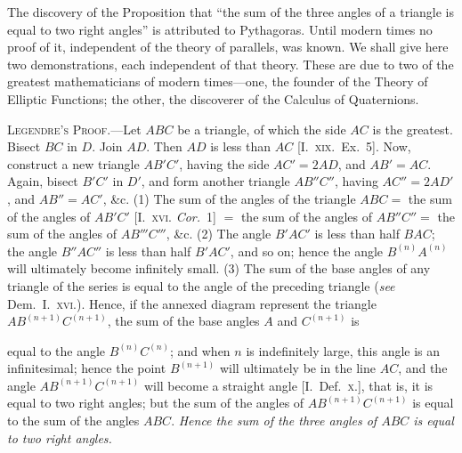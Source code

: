 \documentclass[oneside]{book}
\newcommand\imgcent[2]{
\begin{center}
\end{center}
}
\begin{document}
\begin{footnotesize}
The discovery of the Proposition that ``the sum of the three
angles of a triangle is equal to two right angles'' is attributed to
Pythagoras. Until modern times no proof of it, independent of
the theory of parallels, was known. We shall give here two
demonstrations, each independent of that theory. These are due
to two of the greatest mathematicians of modern times---one, the
founder of the Theory of Elliptic Functions; the other, the discoverer
of the Calculus of Quaternions.

\imgcent{268}{f260}

\textsc{Legendre's Proof.}---Let $ABC$ be a triangle, of which the
side $AC$ is the greatest. Bisect $BC$ in $D$. Join $AD$. Then $AD$ is
less than $AC$ [I.~\textsc{xix.}\ Ex.~5]. Now, construct a new triangle
$AB'C'$, having the side $AC' = 2AD$, and $AB' = AC$. Again, bisect
$B'C'$ in $D'$, and form another triangle $AB''C''$, having $AC'' = 2AD'$,
and $AB'' = AC'$, \&c. (1) The sum of the angles of the triangle $ABC
=$ the sum of the angles of $AB'C'$ [I.~\textsc{xvi.} \emph{Cor.}~1] $=$ the sum of the
angles of $AB''C'' =$ the sum of the angles of $AB'''C'''$, \&c. (2) The
angle $B'AC'$ is less than half $BAC$; the angle $B''AC''$ is less than
half $B'AC'$, and so on; hence the angle $B^{(n)} A^{(n)}$ will ultimately
become infinitely small. (3) The sum of the base angles of any
triangle of the series is equal to the angle of the preceding triangle
(\emph{see} Dem.\ I.~\textsc{xvi.}). Hence, if the annexed diagram
represent the triangle $AB^{(n+1)}C^{(n+1)}$,
the sum of the base angles $A$ and $C^{(n+1)}$ is
\imgcent{278}{f261}
equal to the angle $B^{(n)}C^{(n)}$; and when $n$ is indefinitely large, this
angle is an infinitesimal; hence the point $B^{(n+1)}$ will ultimately be
in the line $AC$, and the angle $AB^{(n+1)}C^{(n+1)}$ will become a straight
angle [I.~Def.\ \textsc{x.}], that is, it is equal to two right angles; but the
sum of the angles of $AB^{(n+1)}C^{(n+1)}$ is equal to the sum of the
angles $ABC$. \emph{Hence the sum of the three angles of $ABC$ is equal
to two right angles.}

\imgcent{215}{f249}


\end{footnotesize}
\end{document}
